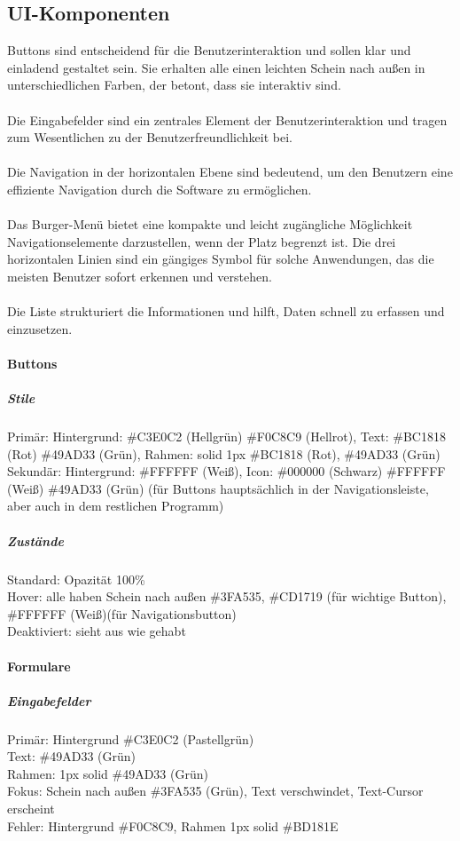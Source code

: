 \subsection{UI-Komponenten}
Buttons sind entscheidend für die Benutzerinteraktion und sollen klar und einladend gestaltet sein.
Sie erhalten alle einen leichten Schein nach außen in unterschiedlichen Farben, der betont, dass sie interaktiv sind.\\
\\
Die Eingabefelder sind ein zentrales Element der Benutzerinteraktion und tragen zum Wesentlichen zu der Benutzerfreundlichkeit bei.\\
\\
Die Navigation in der horizontalen Ebene sind bedeutend, um den Benutzern eine effiziente Navigation durch die Software zu ermöglichen.\\
\\
Das Burger-Menü bietet eine kompakte und leicht zugängliche Möglichkeit Navigationselemente darzustellen, wenn der Platz begrenzt ist.
Die drei horizontalen Linien sind ein gängiges Symbol für solche Anwendungen, das die meisten Benutzer sofort erkennen und verstehen.\\
\\
Die Liste strukturiert die Informationen und hilft, Daten schnell zu erfassen und einzusetzen.

\paragraph{Buttons}
\subparagraph{Stile}
Primär: Hintergrund: \#C3E0C2 (Hellgrün) \#F0C8C9 (Hellrot), Text: \#BC1818 (Rot) \#49AD33 (Grün), Rahmen: solid 1px \#BC1818 (Rot), \#49AD33 (Grün)\\
Sekundär: Hintergrund: \#FFFFFF (Weiß), Icon: \#000000 (Schwarz) \#FFFFFF (Weiß) \#49AD33 (Grün) (für Buttons hauptsächlich in der Navigationsleiste,
aber auch in dem restlichen Programm)

\subparagraph{Zustände}
Standard: Opazität 100\%\\
Hover: alle haben Schein nach außen \#3FA535, \#CD1719 (für wichtige Button), \#FFFFFF (Weiß)(für Navigationsbutton)\\
Deaktiviert: sieht aus wie gehabt

\paragraph{Formulare}
\subparagraph{Eingabefelder}
Primär: Hintergrund \#C3E0C2 (Pastellgrün)\\
Text: \#49AD33 (Grün)\\
Rahmen: 1px solid \#49AD33 (Grün)\\
Fokus: Schein nach außen \#3FA535 (Grün), Text verschwindet, Text-Cursor erscheint\\
Fehler: Hintergrund \#F0C8C9, Rahmen 1px solid \#BD181E

